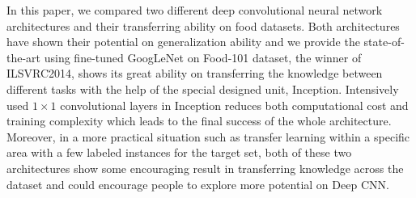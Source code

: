 In this paper, we compared two different deep convolutional neural network architectures and their transferring ability on food datasets. Both architectures have shown their potential on generalization ability and we provide the state-of-the-art using fine-tuned GoogLeNet on Food-101 dataset, the winner of ILSVRC2014, shows its great ability on transferring the knowledge between different tasks with the help of the special designed unit, Inception. Intensively used $1\times 1$ convolutional layers in Inception reduces both computational cost and training complexity which leads to the final success of the whole architecture. Moreover, in a more practical situation such as transfer learning within a specific area with a few labeled instances for the target set, both of these two architectures show some encouraging result in transferring knowledge across the dataset and could encourage people to explore more potential on Deep CNN. 